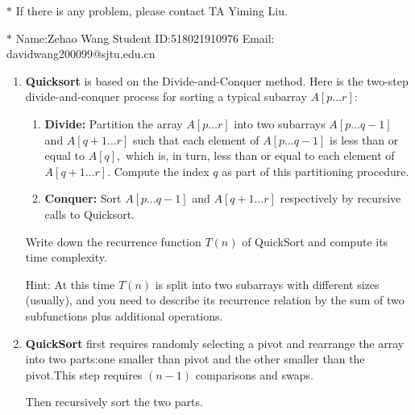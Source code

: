 \documentclass[12pt,a4paper]{article}
\makeatletter
\newtheorem*{solution}{Solution}
\theoremstyle{definition}
\renewenvironment{solution}[1][Solution] {\par\pushQED{\qed}\normalfont\topsep6\p@\@plus6\p@\relax\trivlist\item[\hskip\labelsep\bfseries#1\@addpunct{.}]\ignorespaces}{\popQED\endtrivlist\@endpefalse} \makeatother
\makeatother
\begin{document}
\noindent

\noindent{}
\begin{center}
\footnotesize{\color{red}$*$ If there is any problem, please contact TA Yiming Liu.}

\footnotesize{\color{blue}$*$ Name:Zehao Wang  \quad Student ID:518021910976 \quad Email: davidwang200099@sjtu.edu.cn}
\end{center}

\begin{enumerate}
    \item
    \textbf{Quicksort} is based on the Divide-and-Conquer method. Here is the two-step divide-and-conquer process for sorting a typical subarray $A[p \ldots r]$:
    \begin{enumerate}

    	\item
    	\textbf{Divide:} Partition the array $A[p \ldots r]$ into two subarrays $A[p \ldots q-1]$ and $A[q+1 \ldots r]$ such that each element of $A[p \ldots q-1]$ is less than or equal to $A[q],$ which is, in turn, less than or equal to each element of $A[q+1 \ldots r].$ Compute the index $q$ as part of this partitioning procedure.
    	
    	\item
    	\textbf{Conquer:} Sort $A[p \ldots q-1]$ and $A[q+1 \ldots r]$ respectively by recursive calls to Quicksort.
    	
    \end{enumerate}
    Write down the recurrence function $T(n)$ of QuickSort and compute its time complexity.

    {\color{purple}Hint: At this time $T(n)$ is split into two subarrays with different sizes (usually), and you need to describe its recurrence relation by the sum of two subfunctions plus additional operations.}
    \begin{solution}
    	\textbf{QuickSort} first requires randomly selecting a pivot and rearrange the array into two parts:one smaller than pivot and the other smaller than the pivot.This step requires $(n-1)$ comparisons and swaps.
    	
    	Then recursively sort the two parts.
    	

\end{solution}
\end{enumerate}
\end{document}
